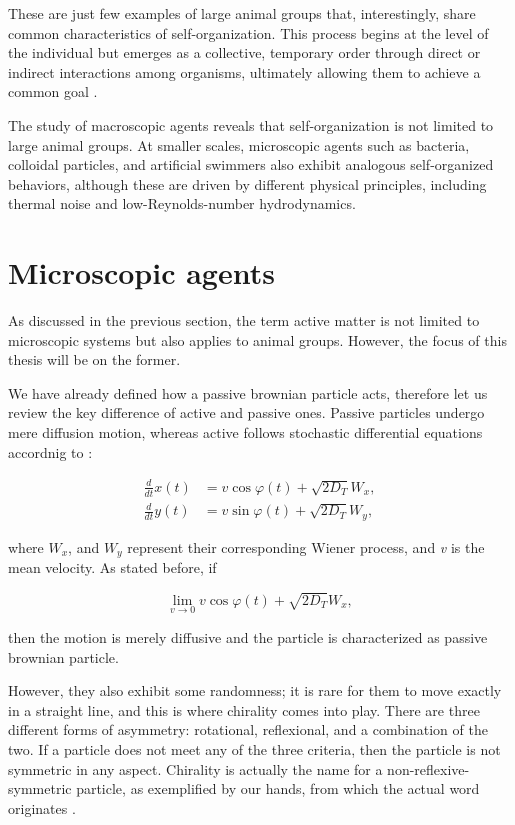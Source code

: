 These are just few examples of large animal groups that, interestingly, share common characteristics of self-organization. This process begins at the level of the individual but emerges as a collective, temporary order through direct or indirect interactions among organisms, ultimately allowing them to achieve a common goal \cite{isaeva2012self}.

The study of macroscopic agents reveals that self-organization is not limited to large animal groups. At smaller scales, microscopic agents such as bacteria, colloidal particles, and artificial swimmers also exhibit analogous self-organized behaviors, although these are driven by different physical principles, including thermal noise and low-Reynolds-number hydrodynamics.

\section{Microscopic agents}

As discussed in the previous section, the term active matter is not limited to microscopic systems but also applies to animal groups. However, the focus of this thesis will be on the former.

We have already defined how a passive brownian particle acts, therefore let us review the key difference of active and passive ones. Passive particles undergo mere diffusion motion, whereas active follows stochastic differential equations accordnig to \cite{volpe2014simulation}:

\begin{align}
  \frac{d}{dt}x(t) &= v\cos{\varphi(t)} + \sqrt{2D_T}W_x,\\
  \frac{d}{dt}y(t) &= v\sin{\varphi(t)} + \sqrt{2D_T}W_y,
  \label{eq:activestochasticequation}
\end{align}

where $W_x$, and $W_y$ represent their corresponding Wiener process, and \textit{v} is the mean velocity. As stated before, if 

\begin{equation}
  \lim_{v \to 0}  v\cos{\varphi(t)} + \sqrt{2D_T}W_x,
  \label{eq:limitofvelocity}
\end{equation}

then the motion is merely diffusive and the particle is characterized as passive brownian particle. 

However, they also exhibit some randomness; it is rare for them to move exactly in a straight line, and this is where chirality comes into play. There are three different forms of asymmetry: rotational, reflexional, and a combination of the two. If a particle does not meet any of the three criteria, then the particle is not symmetric in any aspect. Chirality is actually the name for a non-reflexive-symmetric particle, as exemplified by our hands, from which the actual word originates \cite{cahn1966specification}.

